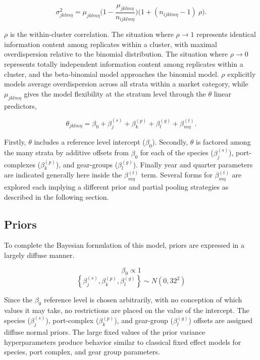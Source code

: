 \documentclass[12pt]{article}
\begin{document}
\[\sigma^2_{jklm\eta} = \mu_{jklm\eta}\Big(1-\frac{\mu_{jklm\eta}}{n_{ijklm\eta}}\Big)\Big(1+(n_{ijklm\eta}-1)~\rho\Big).\]

\(\rho\) is the within-cluster correlation. The situation where
\(\rho\rightarrow1\) represents identical information content among
replicates within a cluster, with maximal overdispersion relative to the
binomial distribution. The situation where \(\rho\rightarrow0\)
represents totally independent information content among replicates
within a cluster, and the beta-binomial model approaches the binomial
model. \(\rho\) explicitly models average overdispersion across all
strata within a market category, while \(\mu_{jklm\eta}\) gives the
model flexibility at the stratum level through the \(\theta\) linear
predictors,

\[\theta_{jklm\eta} = \beta_0 + \beta^{(s)}_j + \beta^{(p)}_k + \beta^{(g)}_l + \beta^{(t)}_{m\eta}.\]

Firstly, \(\theta\) includes a reference level intercept (\(\beta_0\)).
Secondly, \(\theta\) is factored among the many strata by additive
offsets from \(\beta_0\) for each of the species (\(\beta^{(s)}_j\)),
port-complexes (\(\beta^{(p)}_k\)), and gear-groups (\(\beta^{(g)}_l\)).
Finally year and quarter parameters are indicated generally here inside
the \(\beta^{(t)}_{m\eta}\) term. Several forms for
\(\beta^{(t)}_{m\eta}\) are explored each implying a different prior and
partial pooling strategies as described in the following
section. %

\subsection{Priors}\label{priors}

To complete the Bayesian formulation of this model, priors are expressed
in a largely diffuse manner.

\[\beta_0 \propto 1\]
\[\left\{\beta^{(s)}_j, \beta^{(p)}_k, \beta^{(g)}_l\right\} \sim N(0, 32^2)\]

Since the \(\beta_0\) reference level is chosen arbitrarily, with no
conception of which values it may take, no restrictions are placed on
the value of the intercept. The species (\(\beta^{(s)}_j\)),
port-complex (\(\beta^{(p)}_k\)), and gear-group (\(\beta^{(g)}_l\))
offsets are assigned diffuse normal priors. The large fixed values of
the prior variance hyperparameters produce behavior similar to classical
fixed effect models for species, port complex, and gear group
parameters.
\end{document}
